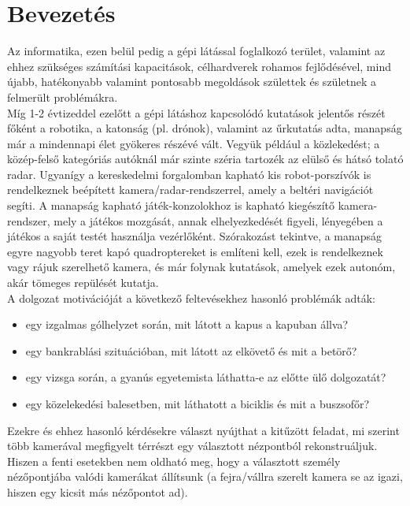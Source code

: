 \chapter*{Bevezetés}

Az informatika, ezen belül pedig a gépi látással foglalkozó terület, valamint az ehhez szükséges számítási kapacitások, célhardverek rohamos fejlődésével, mind újabb, hatékonyabb valamint pontosabb megoldások születtek és születnek a felmerült problémákra.\\

Míg 1-2 évtizeddel ezelőtt a gépi látáshoz kapcsolódó kutatások jelentős részét főként a robotika, a katonság (pl. drónok), valamint az űrkutatás adta, manapság már a mindennapi élet gyökeres részévé vált. Vegyük például a közlekedést; a közép-felső kategóriás autóknál már szinte széria tartozék az elülső és hátsó tolató radar. Ugyanígy a kereskedelmi forgalomban kapható kis robot-porszívók is rendelkeznek beépített kamera/radar-rendszerrel, amely a beltéri navigációt segíti. A manapság kapható játék-konzolokhoz is kapható kiegészítő kamera-rendszer, mely a játékos mozgását, annak elhelyezkedését figyeli, lényegében a játékos a saját testét használja vezérlőként. Szórakozást tekintve, a manapság egyre nagyobb teret kapó quadroptereket is említeni kell, ezek is rendelkeznek vagy rájuk szerelhető kamera, és már folynak kutatások, amelyek ezek autonóm, akár tömeges repülését kutatja.\\

A dolgozat motivációját a következő feltevésekhez hasonló problémák adták:
\begin{itemize}
\item egy izgalmas gólhelyzet során, mit látott a kapus a kapuban állva?
\item egy bankrablási szituációban, mit látott az elkövető és mit a betörő?
\item egy vizsga során, a gyanús egyetemista láthatta-e az előtte ülő dolgozatát?
\item egy közelekedési balesetben, mit láthatott a biciklis és mit a buszsofőr?
\end{itemize}

Ezekre és ehhez hasonló kérdésekre választ nyújthat a kitűzött feladat, mi szerint több kamerával megfigyelt térrészt egy választott nézpontból rekonstruáljuk. Hiszen a fenti esetekben nem oldható meg, hogy a választott személy nézőpontjába valódi kamerákat állítsunk (a fejra/vállra szerelt kamera se az igazi, hiszen egy kicsit más nézőpontot ad).\\


